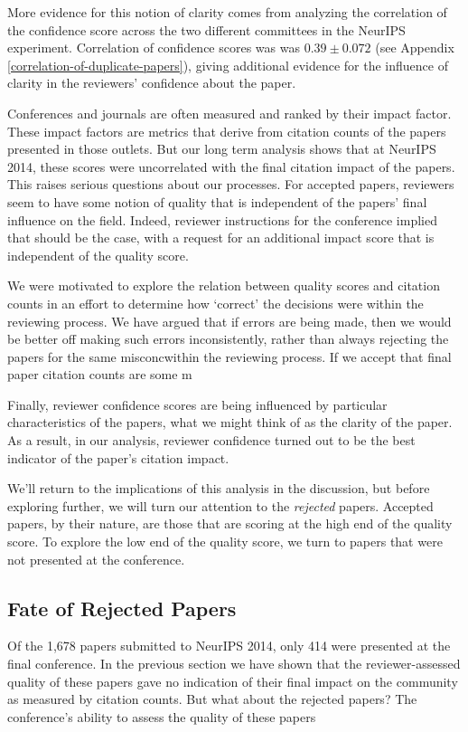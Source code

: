 \documentclass[twoside]{article}
\begin{document}
More evidence for this notion of clarity comes from analyzing the correlation of the confidence score across the two different committees in the NeurIPS experiment. Correlation of confidence scores was was $0.39 \pm 0.072$ (see Appendix \ref{correlation-of-duplicate-papers}), giving additional evidence for the influence of clarity in the reviewers' confidence about the paper.

Conferences and journals are often measured and ranked by their impact factor. These impact factors are metrics that derive from citation counts of the papers presented in those outlets. But our long term analysis shows that at NeurIPS 2014, these scores were uncorrelated with the final citation impact of the papers. This raises serious questions about our processes. For accepted papers, reviewers seem to have some notion of quality that is independent of the papers' final influence on the field. Indeed, reviewer instructions for the conference implied that should be the case, with a request for an additional impact score that is independent of the quality score.

We were motivated to explore the relation between quality scores and citation counts in an effort to determine how `correct' the decisions were within the reviewing process. We have argued that if errors are being made, then we would be better off making such errors inconsistently, rather than always rejecting the papers for the same misconcwithin the reviewing process. If we accept that final paper citation counts are some m

Finally, reviewer confidence scores are being influenced by particular characteristics of the papers, what we might think of as the clarity of the paper. As a result, in our analysis, reviewer confidence turned out to be the best indicator of the paper's citation impact.

We'll return to the implications of this analysis in the discussion, but before exploring further, we will turn our attention to the \emph{rejected} papers. Accepted papers, by their nature, are those that are scoring at the high end of the quality score. To explore the low end of the quality score, we turn to papers that were not presented at the conference.

\subsection{Fate of Rejected Papers}

Of the 1,678 papers submitted to NeurIPS 2014, only 414 were presented at the final conference. In the previous section we have shown that the reviewer-assessed quality of these papers gave no indication of their final impact on the community as measured by citation counts. But what about the rejected papers? The conference's ability to assess the quality of these papers 
\end{document}

